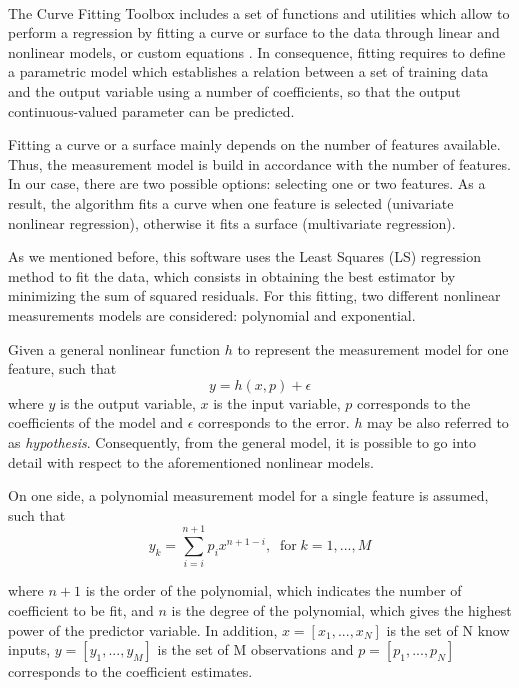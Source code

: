 \documentclass[a4paper, report, oneside, UKenglish]{memoir}
\begin{document}

The Curve Fitting Toolbox\textsuperscript{\tiny\texttrademark} includes a set of functions and utilities which allow to perform a regression by fitting a curve or surface to the data through linear and nonlinear models, or custom equations \cite{MathWorksRegression}. In consequence, fitting requires to define a parametric model which establishes a relation between a set of training data and the output variable using a number of coefficients, so that the output continuous-valued parameter can be predicted. 

Fitting a curve or a surface mainly depends on the number of features available. Thus, the measurement model is build in accordance with the number of features. In our case, there are two possible options: selecting one or two features. As a result, the algorithm fits a curve when one feature is selected (univariate nonlinear regression), otherwise it fits a surface (multivariate regression).

As we mentioned before, this software uses the Least Squares (LS) regression method to fit the data, which consists in obtaining the best estimator by minimizing the sum of squared residuals. For this fitting, two different nonlinear measurements models are considered: polynomial and exponential. 

Given a general nonlinear function $h$ to represent the measurement model for one feature, such that
\begin{equation}
    y = h(x,p) + \epsilon
\end{equation}
where $y$ is the output variable, $x$ is the input variable, $p$ corresponds to the coefficients of the model and $\epsilon$ corresponds to the error. $h$ may be also referred to as \textit{hypothesis}. Consequently, from the general model, it is possible to go into detail with respect to the aforementioned nonlinear models. 

On one side, a polynomial measurement model for a single feature is assumed, such that
\begin{equation}
    y_k = \sum\limits_{i=i}^{n+1} p_{i}x^{n+1-i},  \;\;\mbox{for}\; k = 1,...,M
\end{equation}

where $n+1$ is the order of the polynomial, which indicates the number of coefficient to be fit, and $n$ is the degree of the polynomial, which gives the highest power of the predictor variable. In addition, $x = [x_1,...,x_N]$ is the set of N know inputs, $y = [y_1,...,y_M]$ is the set of M observations and $p = [p_1,...,p_N]$ corresponds to the coefficient estimates.
\end{document}
